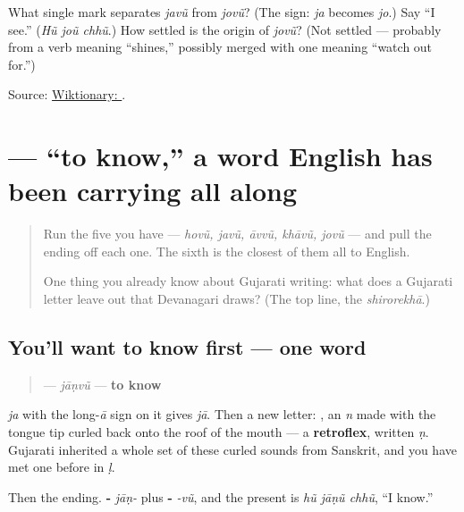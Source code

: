 \begin{tcolorbox}[breakable,colback=teal!4,colframe=teal!35!black,title={Before you move on}]
What single mark separates \emph{javũ} from \emph{jovũ}? (The \textbf{} sign: \emph{ja} becomes \emph{jo}.) Say \textquotedblleft{}I see.\textquotedblright{} (\emph{Hũ joũ chhũ}.) How settled is the origin of \emph{jovũ}? (Not settled — probably from a verb meaning \textquotedblleft{}shines,\textquotedblright{} possibly merged with one meaning \textquotedblleft{}watch out for.\textquotedblright{})

Source: \href{https://en.wiktionary.org/wiki/\%E0\%AA\%9C\%E0\%AB\%8B\%E0\%AA\%B5\%E0\%AB\%81\%E0\%AA\%82}{Wiktionary: }.
\end{tcolorbox}
\section[\texorpdfstring{\gu{જાણવું} (jāṇvũ)}{જાણવું (jāṇvũ)}]{ — \textquotedblleft{}to know,\textquotedblright{} a word English has been carrying all along}

\label{lesson:GU-C07-jaanvun}



\begin{quote}
Run the five you have — \emph{hovũ, javũ, āvvũ, khāvũ, jovũ} — and pull the ending off each one. The sixth is the closest of them all to English.

One thing you already know about Gujarati writing: what does a Gujarati letter leave out that Devanagari draws? (The top line, the \emph{shirorekhā}.)
\end{quote}

\subsection*{You'll want to know first — one word}
\begin{quote}
\textbf{} — \emph{jāṇvũ} — \textbf{to know}
\end{quote}

\textbf{} \emph{ja} with the long-\emph{ā} sign \textbf{} on it gives \emph{jā}. Then a new letter: \textbf{}, an \emph{n} made with the tongue tip curled back onto the roof of the mouth — a \textbf{retroflex}, written \emph{ṇ}. Gujarati inherited a whole set of these curled sounds from Sanskrit, and you have met one before in \textbf{} \emph{ḷ}.

Then the ending. \textbf{-} \emph{jāṇ-} plus \textbf{-} \emph{-vũ}, and the present is \emph{hũ jāṇũ chhũ}, \textquotedblleft{}I know.\textquotedblright{}

